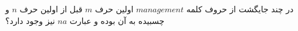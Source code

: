 \p
در چند جایگشت از حروف کلمه $management$
اولین حرف $m$ قبل از اولین حرف $n$ و چسبیده به آن بوده و عبارت $na$ نیز وجود دارد؟